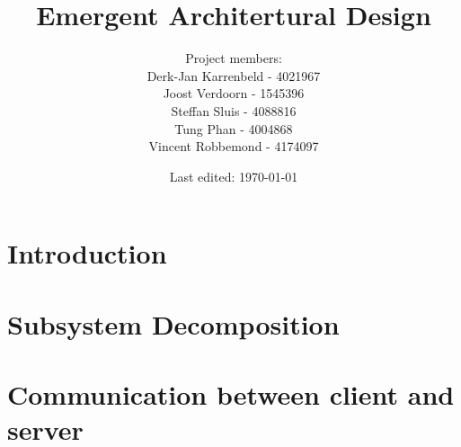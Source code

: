 \documentclass{report}
\title{Emergent Architertural Design}
\date{Last edited: \today}
\author{Project members: \\
	Derk-Jan Karrenbeld - 4021967\\
	Joost Verdoorn - 1545396\\
	Steffan Sluis - 4088816\\
	Tung Phan - 4004868\\
	Vincent Robbemond - 4174097
	}
\begin{document}
	\maketitle
	\tableofcontents
	\section{Introduction}
	\section{Subsystem Decomposition}
	\section{Communication between client and server}
\end{document}
